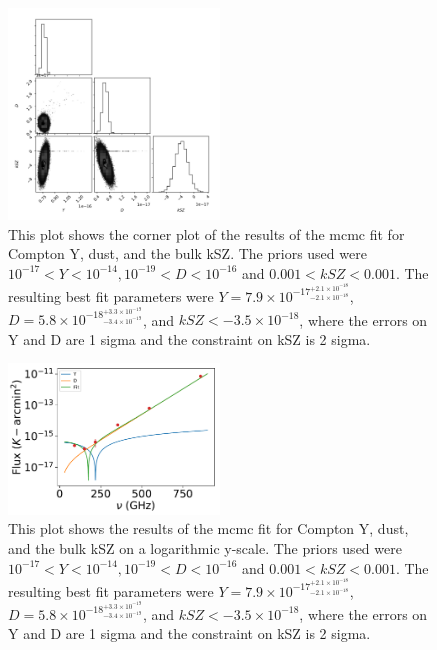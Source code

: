 \documentclass{princeton_astro_thesis}
\begin{document}
\begin{figure}[h]
\centering
\includegraphics[width=0.5\textwidth]{../BulkkSZplot.pdf}
\caption{This plot shows the corner plot of the results of the mcmc fit for Compton Y, dust, and the bulk kSZ. The priors used were $ 10^{-17} < Y < 10^{-14}, 10^{-19}< D < 10^{-16}$ and $0.001 < kSZ <0.001.$ The resulting best fit parameters were $Y=7.9\times10^{-17^{+2.1\times10^{-18}}_{-2.1\times10^{-18}}}$, $D=5.8\times10^{-18^{+3.3\times10^{-19}}_{-3.4\times10^{-19}}}$, and $kSZ<-3.5\times10^{-18}$, where the errors on Y and D are 1 sigma and the constraint on kSZ is 2 sigma.}
\end{figure}

\begin{figure}[h]
\centering
\includegraphics[width=0.5\textwidth]{../redmapper_apfluxes_kSZfitlog.pdf}
\caption{This plot shows  the results of the mcmc fit for Compton Y, dust, and the bulk kSZ on a logarithmic y-scale. The priors used were $ 10^{-17} < Y < 10^{-14}, 10^{-19}< D < 10^{-16}$ and $0.001 < kSZ <0.001.$ The resulting best fit parameters were $Y=7.9\times10^{-17^{+2.1\times10^{-18}}_{-2.1\times10^{-18}}}$, $D=5.8\times10^{-18^{+3.3\times10^{-19}}_{-3.4\times10^{-19}}}$, and $kSZ<-3.5\times10^{-18}$, where the errors on Y and D are 1 sigma and the constraint on kSZ is 2 sigma.} %
\end{figure}
\end{document}

